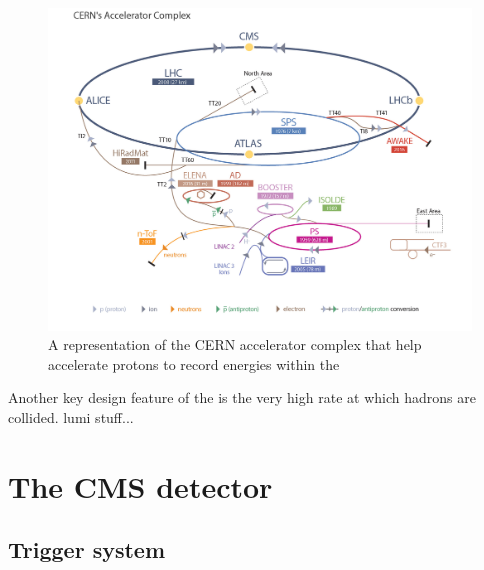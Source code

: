 \begin{figure}
  \includegraphics[width=\largefigwidth]{figs/LHC_default}
  \caption[]%
  {A representation of the CERN accelerator complex that help
  accelerate protons to record energies within the \LHC
  \cite{stfc:lhc}}%
  \label{fig:lhc}
\end{figure}

Another key design feature of the \LHC is the very high rate at which
hadrons are collided. lumi stuff...

\cite{Evans:2008zzb} 


\section{The CMS detector}
\label{sec:cms}

\subsection{Trigger system}
\label{sec:triggers}

